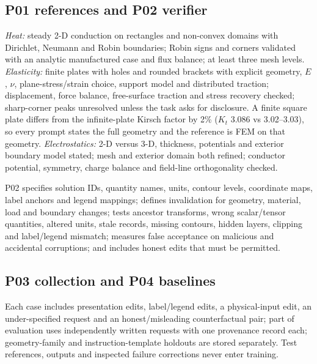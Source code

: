 \documentclass[11pt,a4paper]{article}
\begin{document}
\subsection{P01 references and P02 verifier}

\emph{Heat:} steady 2-D conduction on rectangles and non-convex domains with Dirichlet, Neumann and Robin boundaries; Robin signs and corners validated with an analytic manufactured case and flux balance; at least three mesh levels. \emph{Elasticity:} finite plates with holes and rounded brackets with explicit geometry, $E$, $\nu$, plane-stress/strain choice, support model and distributed traction; displacement, force balance, free-surface traction and stress recovery checked; sharp-corner peaks unresolved unless the task asks for disclosure. A finite square plate differs from the infinite-plate Kirsch factor by 2\% ($K_t$ 3.086 vs 3.02--3.03), so every prompt states the full geometry and the reference is FEM on that geometry. \emph{Electrostatics:} 2-D versus 3-D, thickness, potentials and exterior boundary model stated; mesh and exterior domain both refined; conductor potential, symmetry, charge balance and field-line orthogonality checked.

P02 specifies solution IDs, quantity names, units, contour levels, coordinate maps, label anchors and legend mappings; defines invalidation for geometry, material, load and boundary changes; tests ancestor transforms, wrong scalar/tensor quantities, altered units, stale records, missing contours, hidden layers, clipping and label/legend mismatch; measures false acceptance on malicious and accidental corruptions; and includes honest edits that must be permitted.

\subsection{P03 collection and P04 baselines}

Each case includes presentation edits, label/legend edits, a physical-input edit, an under-specified request and an honest/misleading counterfactual pair; part of evaluation uses independently written requests with one provenance record each; geometry-family and instruction-template holdouts are stored separately. Test references, outputs and inspected failure corrections never enter training.
\end{document}
